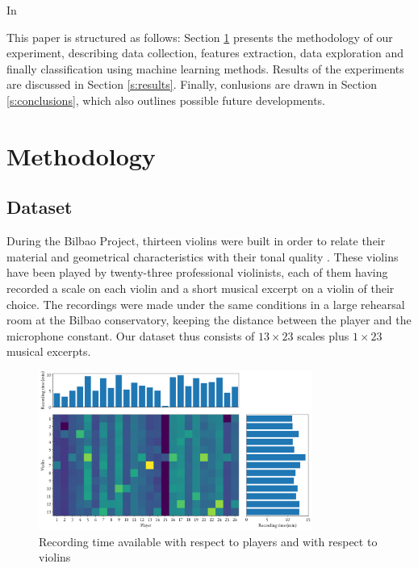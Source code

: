 \documentclass[letterpaper,11pt,leqno]{article}
\begin{document}
In \cite{zhaoViolinistIdentificationUsing2022}

This paper is structured as follows: Section \ref{s:methodology} presents the methodology of our experiment, describing data collection, features extraction, data exploration and finally classification using machine learning methods. Results of the experiments are discussed in Section \ref{s:results}. Finally, conlusions are drawn in Section \ref*{s:conclusions}, which also outlines possible future developments. 

\section{Methodology}\label{s:methodology}

\subsection{Dataset}

During the Bilbao Project, thirteen violins were built in order to relate their material and geometrical characteristics with their tonal quality \citep{fritzBilbaoProjectSearching2021}. These violins have been played by twenty-three professional violinists, each of them having recorded a scale on each violin and a short musical excerpt on a violin of their choice. The recordings were made under the same conditions in a large rehearsal room at the Bilbao conservatory, keeping the distance between the player and the microphone constant. Our dataset thus consists of $13 \times 23$ scales plus $1 \times 23$ musical excerpts.

\begin{figure}[h]
	\includegraphics[width=0.8\textwidth]{../figures/class_weights.png}
	\caption{Recording time available with respect to players and with respect to violins}
\end{figure}
\end{document}
